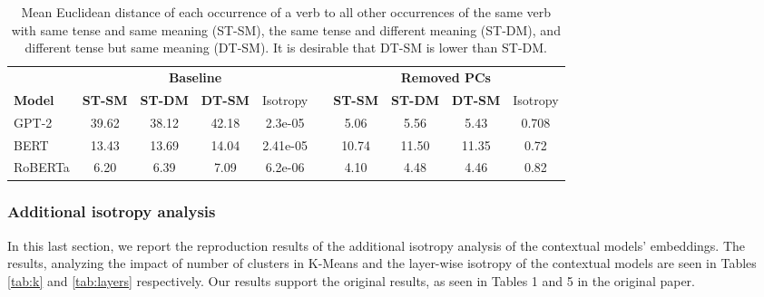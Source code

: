 \setlength{\tabcolsep}{5pt}
{\renewcommand{\arraystretch}{1.1}
\begin{table}[h]
\centering
\begin{tabular}{lcccclcccc} 
\hline
               & \multicolumn{4}{c}{\textbf{Baseline}}                       &  & \multicolumn{4}{c}{\textbf{Removed PCs}}                     \\ 
\cline{2-5}\cline{7-10}
\textbf{Model} & \textbf{ST-SM} & \textbf{ST-DM} & \textbf{DT-SM} & Isotropy &  & \textbf{ST-SM} & \textbf{ST-DM} & \textbf{DT-SM} & Isotropy  \\ 
\hline
GPT-2          & 39.62          & 38.12          & 42.18          & 2.3e-05  &  & 5.06           & 5.56           & 5.43           & 0.708     \\
BERT           & 13.43          & 13.69          & 14.04          & 2.41e-05 &  & 10.74          & 11.50          & 11.35          & 0.72      \\
RoBERTa        & 6.20           & 6.39           & 7.09           & 6.2e-06  &  & 4.10           & 4.48           & 4.46           & 0.82      \\
\hline
\end{tabular}
\caption{Mean Euclidean distance of each occurrence of a verb to all other occurrences of the same verb with same tense and same meaning (ST-SM), the same tense and different meaning (ST-DM), and different tense but same meaning (DT-SM). It is desirable that DT-SM is lower than ST-DM.}
\label{tab:tense}
\end{table}}

\subsubsection{Additional isotropy analysis}

In this last section, we report the reproduction results of the additional isotropy analysis of the contextual models' embeddings. The results, analyzing the impact of number of clusters in K-Means and the layer-wise isotropy of the contextual models are seen in Tables \ref{tab:k} and \ref{tab:layers} respectively. Our results support the original results, as seen in Tables 1 and 5 in the original paper.


